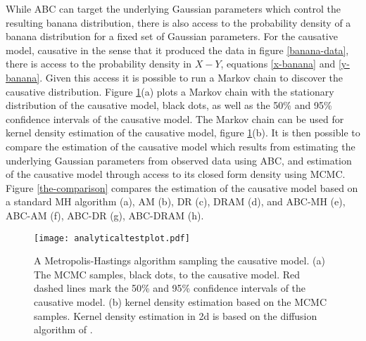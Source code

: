 While ABC can target the underlying Gaussian parameters which control the resulting banana distribution, there is also access to the probability density of a banana distribution for a fixed set of Gaussian parameters. For the causative model, causative in the sense that it produced the data in figure \ref{banana-data}, there is access to the probability density in $X-Y$, equations \ref{x-banana} and \ref{y-banana}. Given this access it is possible to run a Markov chain to discover the causative distribution. Figure \ref{Analytical-banana}(a) plots a Markov chain with the stationary distribution of the causative model, black dots, as well as the 50\% and 95\% confidence intervals of the causative model. The Markov chain can be used for kernel density estimation of the causative model, figure \ref{Analytical-banana}(b). It is then possible to compare the estimation of the causative model which results from estimating the underlying Gaussian parameters from observed data using ABC, and estimation of the causative model through access to its closed form density using MCMC. Figure \ref{the-comparison} compares the estimation of the causative model based on a standard MH algorithm (a), AM (b), DR (c), DRAM (d), and ABC-MH (e), ABC-AM (f), ABC-DR (g), ABC-DRAM (h). 

\begin{figure}[H]
\centering
\texttt{[image: analyticaltestplot.pdf]}
\caption{A Metropolis-Hastings algorithm sampling the causative model. (a) The MCMC samples, black dots, to the causative model. Red dashed lines mark the 50\% and 95\% confidence intervals of the causative model. (b) kernel density estimation based on the MCMC samples. Kernel density estimation in 2d is based on the diffusion algorithm of \citet{Botev2010}.}
\label{Analytical-banana}
\end{figure}

